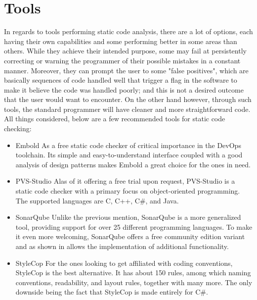 
\section{Tools}\label{sect:tools}
In regards to tools performing static code analysis, there are a lot of options, each having their own capabilities and some performing better in some areas than others. While they achieve their intended purpose, some may fail at persistently correcting or warning the programmer of their possible mistakes in a constant manner. Moreover, they can prompt the user to some "false positives", which are basically sequences of code handled well that trigger a flag in the software to make it believe the code was handled poorly; and this is not a desired outcome that the user would want to encounter. On the other hand however, through such tools, the standard programmer will have cleaner and more straightforward code. All things considered, below are a few recommended tools for static code checking:
\begin{itemize}
    \item Embold \newline
    As a free static code checker of critical importance in the DevOps toolchain. Its simple and easy-to-understand interface coupled with a good analysis of design patterns makes Embold a great choice for the ones in need.
    \item PVS-Studio \newline
    Alas of it offering a free trial upon request, PVS-Studio is a static code checker with a primary focus on object-oriented programming. The supported languages are C, C++, C\#, and Java.
    \item SonarQube \newline
    Unlike the previous mention, SonarQube is a more generalized tool, providing support for over 25 different programming languages. To make it even more welcoming, SonarQube offers a free community edition variant and as shown in \cite{garcia2016improved} allows the implementation of additional functionality.
    \item StyleCop \newline
    For the ones looking to get affiliated with coding conventions, StyleCop is the best alternative. It has about 150 rules, among which naming conventions, readability, and layout rules, together with many more. The only downside being the fact that StyleCop is made entirely for C\#.
\end{itemize}
